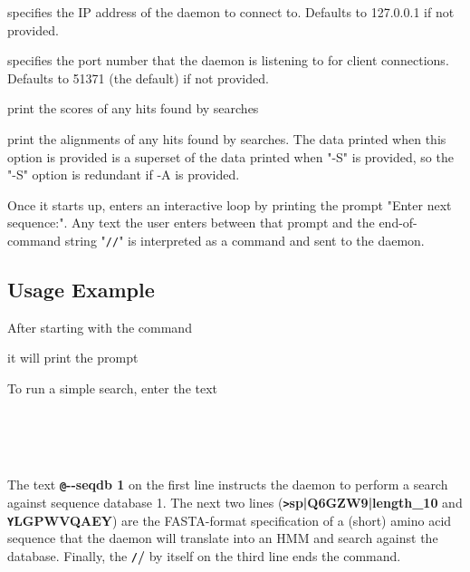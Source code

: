 \documentclass[notoc,justified]{tufte-book}    %
\begin{document}
{\begin{sreitems}{}
  \item[\monob{-i <IP address>}] specifies the IP address of the daemon to connect to.  Defaults to 127.0.0.1 if not provided.
  \item[\monob{-p <port>}] specifies the port number that the daemon is listening to for client connections.  Defaults to 51371 (the  default) if not provided.
  \item[\monob{-S}] print the scores of any hits found by searches
  \item[\monob{-A}] print the alignments of any hits found by searches.  The data printed when this option is provided is a superset of the data printed when "-S" is provided, so the "-S" option is redundant if -A is provided.
\end{sreitems}

Once it starts up,  enters an interactive loop by printing the prompt "Enter next sequence:".  Any text the user enters between that prompt and the end-of-command string "{\tt //}" is interpreted as a command and sent to the daemon.  

\subsection{Usage Example}
After starting  with the command

\vspace{1ex}
\vspace{1ex}

it will print the prompt

 \vspace{-1ex}
 \vspace{-1ex}

To run a simple search, enter the text

\vspace{1ex}
 \\
 \\
 \\
\user{//}
\vspace{1ex}

The text {\small\bfseries\texttt @-{}-seqdb 1} on the first line instructs the daemon to perform a search against sequence database 1. The next two lines ({\small\bfseries\texttt >sp|Q6GZW9|length\_10} and {\small\bfseries\texttt YLGPWVQAEY}) are the FASTA-format specification of a (short) amino acid sequence that the daemon will translate into an HMM and search against the database.  Finally, the 
{\small\bfseries\texttt //} by itself on the third line ends the command.  

}
\end{document}
